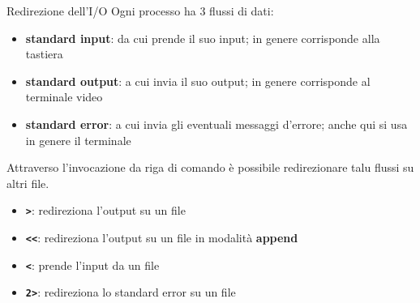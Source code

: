 \documentclass{beamer}
\begin{document}
    \begin{frame}{Redirezione dell'I/O}
        Ogni processo ha 3 flussi di dati:

        \begin{itemize}
            \item \textbf{standard input}: da cui prende il suo input; in genere corrisponde alla tastiera
            \item \textbf{standard output}: a cui invia il suo output; in genere corrisponde al terminale video
            \item \textbf{standard error}: a cui invia gli eventuali messaggi d'errore; anche qui si usa in genere il terminale
        \end{itemize}

        Attraverso l'invocazione da riga di comando è possibile
        redirezionare talu flussi su altri file.

        \begin{itemize}
            \item \texttt{\textbf{>}}: redireziona l'output su un file
            \item \texttt{\textbf{<{}<}}: redireziona l'output su un file in modalità \textbf{append}
            \item \texttt{\textbf{<}}: prende l'input da un file
            \item \texttt{\textbf{2>}}: redireziona lo standard error su un file
        \end{itemize}
    \end{frame}
\end{document}
